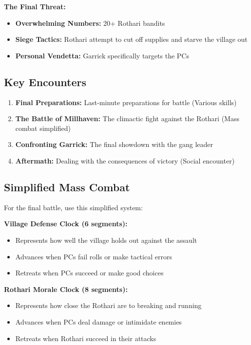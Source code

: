 \documentclass[11pt]{article}
\begin{document}
\textbf{The Final Threat:}
\begin{itemize}
\item \textbf{Overwhelming Numbers:} 20+ Rothari bandits
\item \textbf{Siege Tactics:} Rothari attempt to cut off supplies and starve the village out
\item \textbf{Personal Vendetta:} Garrick specifically targets the PCs
\end{itemize}

\subsection{Key Encounters}

\begin{enumerate}
\item \textbf{Final Preparations:} Last-minute preparations for battle (Various skills)
\item \textbf{The Battle of Millhaven:} The climactic fight against the Rothari (Mass combat simplified)
\item \textbf{Confronting Garrick:} The final showdown with the gang leader
\item \textbf{Aftermath:} Dealing with the consequences of victory (Social encounter)
\end{enumerate}

\subsection{Simplified Mass Combat}

For the final battle, use this simplified system:

\textbf{Village Defense Clock (6 segments):}
\begin{itemize}
\item Represents how well the village holds out against the assault
\item Advances when PCs fail rolls or make tactical errors
\item Retreats when PCs succeed or make good choices
\end{itemize}

\textbf{Rothari Morale Clock (8 segments):}
\begin{itemize}
\item Represents how close the Rothari are to breaking and running
\item Advances when PCs deal damage or intimidate enemies
\item Retreats when Rothari succeed in their attacks
\end{itemize}
\end{document}
